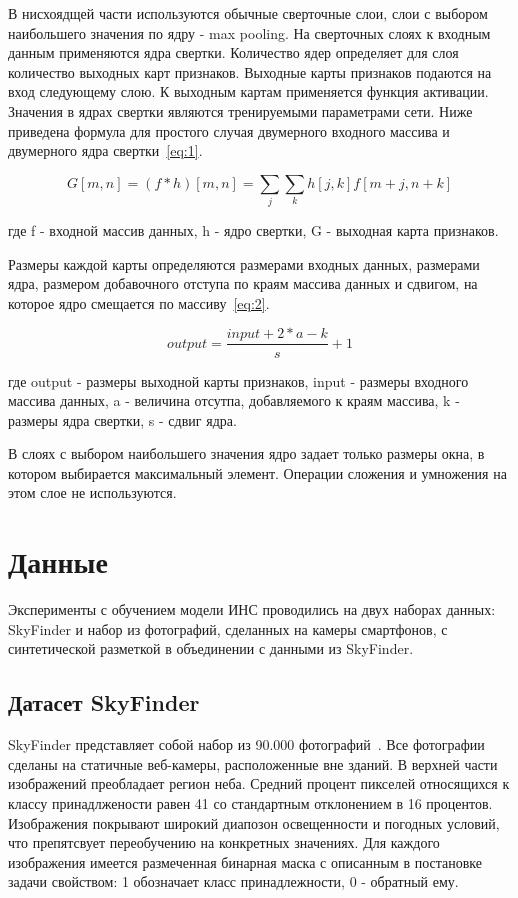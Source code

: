 В нисхоядщей части используются обычные сверточные слои, слои с выбором наибольшего значения по ядру - max pooling.
На сверточных слоях к входным данным применяются ядра свертки.
Количество ядер определяет для слоя количество выходных карт признаков.
Выходные карты признаков подаются на вход следующему слою.
К выходным картам применяется функция активации.
Значения в ядрах свертки являются тренируемыми параметрами сети.
Ниже приведена формула для простого случая двумерного входного массива и двумерного ядра свертки~\eqref{eq:1}.

\begin{equation}
    \label{eq:1}
    G[m, n] = (f*h)[m, n] = \sum_{j}{\sum_{k}{h[j, k]f[m + j, n + k]}}
\end{equation}

где f - входной массив данных, h - ядро свертки, G - выходная карта признаков.

Размеры каждой карты определяются размерами входных данных, размерами ядра, размером добавочного отступа по краям массива данных и сдвигом,
на которое ядро смещается по массиву~\eqref{eq:2}.

\begin{equation}
    \label{eq:2}
    output = \frac{input + 2 * a - k}{s} + 1
\end{equation}

где output - размеры выходной карты признаков, input - размеры входного массива данных, a - величина отсутпа, добавляемого к краям массива,
k - размеры ядра свертки, s - сдвиг ядра.

В слоях с выбором наибольшего значения ядро задает только размеры окна, в котором выбирается максимальный элемент.
Операции сложения и умножения на этом слое не используются.


\section{Данные}

Эксперименты с обучением модели ИНС проводились на двух наборах данных: SkyFinder и набор из фотографий, сделанных на камеры смартфонов,
с синтетической разметкой в объединении с данными из SkyFinder.

\subsection{Датасет SkyFinder}

SkyFinder представляет собой набор из 90.000 фотографий~\autocite{mihail2016sky}.
Все фотографии сделаны на статичные веб-камеры, расположенные вне зданий.
В верхней части изображений преобладает регион неба.
Средний процент пикселей относящихся к классу принадлжености равен 41 со стандартным отклонением в 16 процентов.
Изображения покрывают широкий диапозон освещенности и погодных условий, что препятсвует переобучению на конкретных значениях.
Для каждого изображения имеется размеченная бинарная маска с описанным в постановке задачи свойством: 1 обозначает класс принадлежности, 0 - обратный ему.


